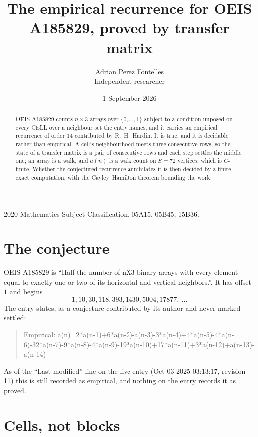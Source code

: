 \documentclass[11pt,a4paper]{article}
\title{The empirical recurrence for OEIS A185829, proved by transfer matrix}
\author{Adrian Perez Fontelles\\ \small Independent researcher}
\date{1 September 2026}
\theoremstyle{plain}
\theoremstyle{definition}
\begin{document}
\maketitle

\begin{abstract}
OEIS A185829 counts $n\times3$ arrays over $\{0,\dots,1\}$ subject to a condition imposed on
every CELL over a neighbour set the entry names, and it carries an empirical recurrence of
order $14$ contributed by R.~H.~Hardin. It is true, and it is decidable rather than
empirical. A cell's neighbourhood meets three consecutive rows, so the state of a transfer
matrix is a pair of consecutive rows and each step settles the middle one; an array is a
walk, and $a(n)$ is a walk count on $S=72$ vertices, which is $C$-finite. Whether the
conjectured recurrence annihilates it is then decided by a finite exact computation, with the
Cayley--Hamilton theorem bounding the work.
\end{abstract}

\noindent\small 2020 Mathematics Subject Classification. 05A15, 05B45, 15B36.\normalsize

\section{The conjecture}

OEIS A185829 is ``Half the number of nX3 binary arrays with every element equal to exactly one or two of its horizontal and vertical neighbors.''. It has offset $1$ and begins
\[
1, 10, 30, 118, 393, 1430, 5004, 17877,\ \dots
\]
The entry states, as a conjecture contributed by its author and never marked settled:
\begin{quote}
Empirical: a(n)=2*a(n-1)+6*a(n-2)-a(n-3)-3*a(n-4)+4*a(n-5)-4*a(n-6)-32*a(n-7)-9*a(n-8)-4*a(n-9)-19*a(n-10)+17*a(n-11)+3*a(n-12)+a(n-13)-a(n-14)
\end{quote}
As of the ``Last modified'' line on the live entry (Oct 03 2025 03:13:17, revision 11) this is still
recorded as empirical, and nothing on the entry records it as proved.

\section{Cells, not blocks}
\end{document}
